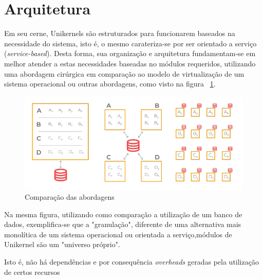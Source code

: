 \documentclass[12pt]{article}
\begin{document}
\section{Arquitetura}

Em seu cerne, Unikernels são estruturados para funcionarem baseados na necessidade do sistema, isto é, o mesmo carateriza-se por ser orientado a serviço (\textit{service-based}). Desta forma, sua organização e arquitetura fundamentam-se em melhor atender a estas necessidades baseadas no módulos requeridos, utilizando uma abordagem cirúrgica em comparação ao modelo de virtualização de um sistema operacional ou outras abordagens, como visto na figura ~\ref{fig:fig1}.

\begin{figure}[H]
\centering
\includegraphics[width=.8\textwidth]{fig1.png}
\caption{Comparação das abordagens \cite{fraga:120}}
\label{fig:fig1}
\end{figure}

 Na mesma figura, utilizando como comparação a utilização de um banco de dados, exemplifica-se que a "granulação", diferente de uma alternativa mais monolítica de um sistema operacional ou orientada a serviço,módulos de Unikernel são um "universo próprio". 
 
 Isto é, não há dependências e por consequência \textit{overheads} geradas pela utilização de certos recursos




\end{document}
